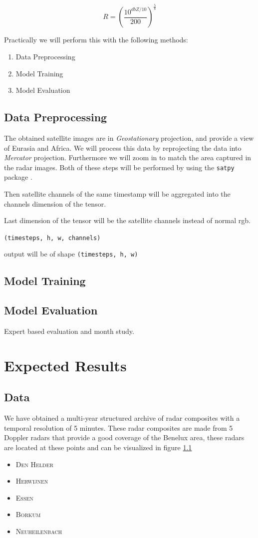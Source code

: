 \documentclass[acmtog, authorversion]{acmart}
\begin{document}
$$R = (\frac{10^{dbZ/10}}{200})^{\frac{5}{8}}$$

Practically we will perform this with the following methods:
\begin{enumerate}
    \item Data Preprocessing
    \item Model Training
    \item Model Evaluation
\end{enumerate}

\subsection{Data Preprocessing}
The obtained satellite images are in \textit{Geostationary} projection, and provide a view of Eurasia and Africa. We will process this data by reprojecting the data into \textit{Mercator} projection. Furthermore we will zoom in to match the area captured in the radar images. Both of these steps will be performed by using the \texttt{satpy} package \cite{}.

Then satellite channels of the same timestamp will be aggregated into the channels dimension of the tensor.

Last dimension of the tensor will be the satellite channels instead of normal rgb.

\texttt{(timesteps, h, w, channels)}

output will be of shape \texttt{(timesteps, h, w)}

\subsection{Model Training}

\subsection{Model Evaluation}
Expert based evaluation and month study.

\section{Expected Results}

\subsection{Data}

We have obtained a multi-year structured archive of radar composites with a temporal resolution of 5 minutes. These radar composites are made from 5 Doppler radars that provide a good coverage of the Benelux area, these radars are located at these points and can be visualized in figure \ref{}
\begin{itemize}
    \item \textsc{Den Helder}
    \item \textsc{Herwijnen}
    \item \textsc{Essen}
    \item \textsc{Borkum}
    \item \textsc{Neuheilenbach}
\end{itemize}
\end{document}
